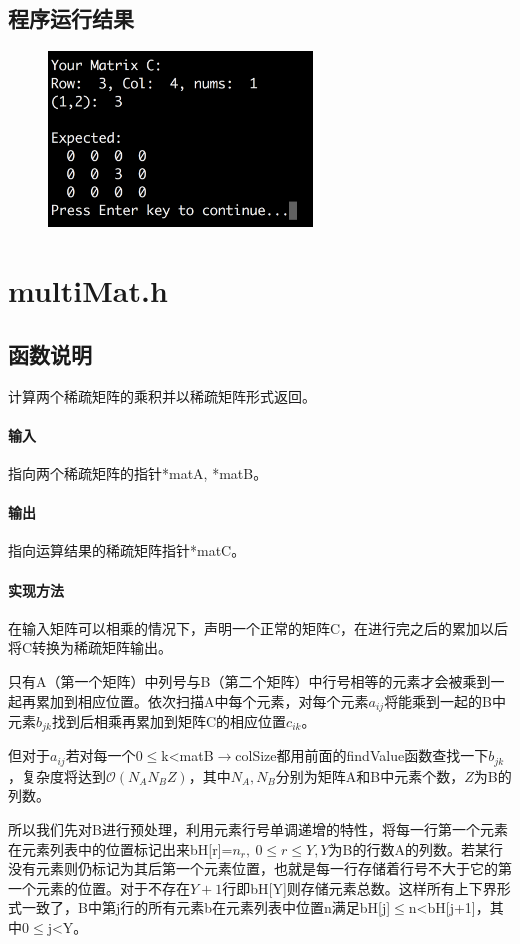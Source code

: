 \documentclass{homework}
\begin{document}
\subsection{程序运行结果}
\begin{figure}[H]
    \centering
    \includegraphics[width=7cm]{fig1.png}
\end{figure}
\section{multiMat.h}
\subsection{函数说明}
计算两个稀疏矩阵的乘积并以稀疏矩阵形式返回。
\paragraph{输入}
指向两个稀疏矩阵的指针*matA, *matB。
\paragraph{输出}
指向运算结果的稀疏矩阵指针*matC。
\paragraph{实现方法}
在输入矩阵可以相乘的情况下，声明一个正常的矩阵C，在进行完之后的累加以后将C转换为稀疏矩阵输出。

只有A（第一个矩阵）中列号与B（第二个矩阵）中行号相等的元素才会被乘到一起再累加到相应位置。依次扫描A中每个元素，对每个元素$a_{ij}$将能乘到一起的B中元素$b_{jk}$找到后相乘再累加到矩阵C的相应位置$c_{ik}$。

但对于$a_{ij}$若对每一个$0\leqslant$k<matB$\to$colSize都用前面的findValue函数查找一下$b_{jk}$，复杂度将达到$\mathcal{O}(N_AN_BZ)$，其中$N_A,N_B$分别为矩阵A和B中元素个数，$Z$为B的列数。

所以我们先对B进行预处理，利用元素行号单调递增的特性，将每一行第一个元素在元素列表中的位置标记出来bH[r]=$n_r,~0\leqslant r\leqslant Y,Y$为B的行数A的列数。若某行没有元素则仍标记为其后第一个元素位置，也就是每一行存储着行号不大于它的第一个元素的位置。对于不存在$Y+1$行即bH[Y]则存储元素总数。这样所有上下界形式一致了，B中第j行的所有元素b在元素列表中位置n满足bH[j]$\leqslant$n<bH[j+1]，其中0$\leqslant$j<Y。
\end{document}
